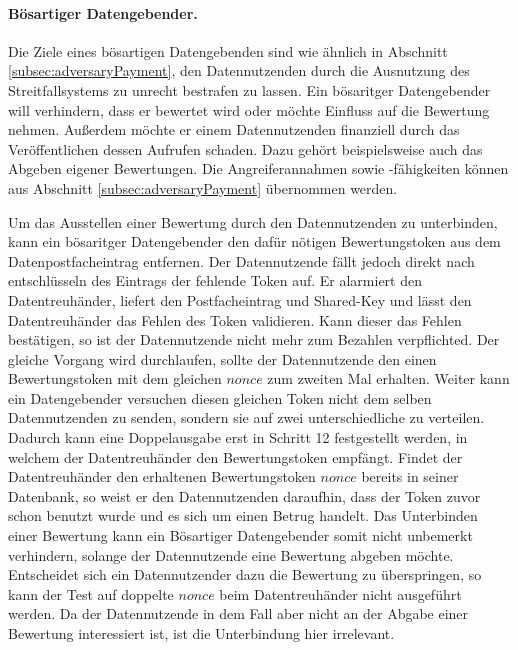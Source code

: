 \documentclass[
	fontsize=12pt,
	headings=small,
	parskip=half,           %
	bibliography=totoc,
	numbers=noenddot,       %
	open=any,               %
]{scrreprt}
\begin{document}
\paragraph{Bösartiger Datengebender.}
Die Ziele eines bösartigen Datengebenden sind wie ähnlich in Abschnitt \ref{subsec:adversaryPayment}, den Datennutzenden durch die Ausnutzung des Streitfallsystems zu unrecht bestrafen zu lassen. Ein bösaritger Datengebender will verhindern, dass er bewertet wird oder möchte Einfluss auf die Bewertung nehmen. Außerdem möchte er einem Datennutzenden finanziell durch das Veröffentlichen dessen Aufrufen schaden. Dazu gehört beispielsweise auch das Abgeben eigener Bewertungen. Die Angreiferannahmen sowie -fähigkeiten können aus Abschnitt \ref{subsec:adversaryPayment} übernommen werden.

Um das Ausstellen einer Bewertung durch den Datennutzenden zu unterbinden, kann ein bösaritger Datengebender den dafür nötigen Bewertungstoken aus dem Datenpostfacheintrag entfernen. Der Datennutzende fällt jedoch direkt nach entschlüsseln des Eintrags der fehlende Token auf. Er alarmiert den Datentreuhänder, liefert den Postfacheintrag und Shared-Key und lässt den Datentreuhänder das Fehlen des Token validieren. Kann dieser das Fehlen bestätigen, so ist der Datennutzende nicht mehr zum Bezahlen verpflichted. Der gleiche Vorgang wird durchlaufen, sollte der Datennutzende den einen Bewertungstoken mit dem gleichen $nonce$ zum zweiten Mal erhalten. Weiter kann ein Datengebender versuchen diesen gleichen Token nicht dem selben Datennutzenden zu senden, sondern sie auf zwei unterschiedliche zu verteilen. Dadurch kann eine Doppelausgabe erst in Schritt 12 festgestellt werden, in welchem der Datentreuhänder den Bewertungstoken empfängt. Findet der Datentreuhänder den erhaltenen Bewertungstoken $nonce$ bereits in seiner Datenbank, so weist er den Datennutzenden daraufhin, dass der Token zuvor schon benutzt wurde und es sich um einen Betrug handelt. Das Unterbinden einer Bewertung kann ein Bösartiger Datengebender somit nicht unbemerkt verhindern, solange der Datennutzende eine Bewertung abgeben möchte. Entscheidet sich ein Datennutzender dazu die Bewertung zu überspringen, so kann der Test auf doppelte $nonce$ beim Datentreuhänder nicht ausgeführt werden. Da der Datennutzende in dem Fall aber nicht an der Abgabe einer Bewertung interessiert ist, ist die Unterbindung hier irrelevant.
\end{document}
